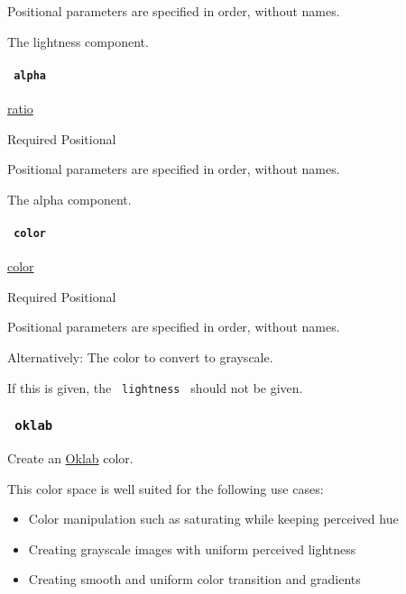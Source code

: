 \label{definitions-luma-lightness-positional-tooltip}
Positional parameters are specified in order, without names.

The lightness component.

\paragraph{\texorpdfstring{\texttt{\ alpha\ }}{ alpha }}\label{definitions-luma-alpha}

\href{/docs/reference/layout/ratio/}{ratio}

{Required} {{ Positional }}

\label{definitions-luma-alpha-positional-tooltip}
Positional parameters are specified in order, without names.

The alpha component.

\paragraph{\texorpdfstring{\texttt{\ color\ }}{ color }}\label{definitions-luma-color}

\href{/docs/reference/visualize/color/}{color}

{Required} {{ Positional }}

\label{definitions-luma-color-positional-tooltip}
Positional parameters are specified in order, without names.

Alternatively: The color to convert to grayscale.

If this is given, the \texttt{\ lightness\ } should not be given.

\subsubsection{\texorpdfstring{\texttt{\ oklab\ }}{ oklab }}\label{definitions-oklab}

Create an \href{https://bottosson.github.io/posts/oklab/}{Oklab} color.

This color space is well suited for the following use cases:

\begin{itemize}
\tightlist
\item
  Color manipulation such as saturating while keeping perceived hue
\item
  Creating grayscale images with uniform perceived lightness
\item
  Creating smooth and uniform color transition and gradients
\end{itemize}


